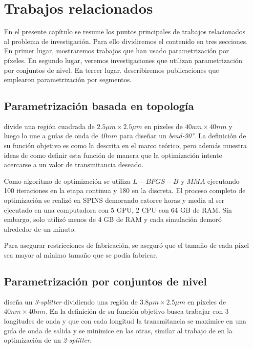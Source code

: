 \chapter{Trabajos relacionados}

En el presente capítulo se resume los puntos principales de trabajos relacionados al problema de investigación.
Para ello dividiremos el contenido en tres secciones. 
En primer lugar, mostraremos trabajos que han usado parametrización por píxeles.
En segundo lugar, veremos investigaciones que utilizan parametrización por conjuntos de nivel.
En tercer lugar, describiremos publicaciones que emplearon parametrización por segmentos.

\section{Parametrización basada en topología}

\cite{Su2020} divide una región cuadrada de $2.5 \mu m \times 2.5 \mu m$ en píxeles de $40 nm \times 40 nm$ y luego lo une a guías de onda de $40 nm$ para diseñar un \emph{bend-90°}. 
La definición de su función objetivo es como la descrita en el marco teórico, pero además muestra ideas de como definir esta función de manera que la optimización intente acercarse a un valor de transmitancia deseado.

Como algoritmo de optimización se utiliza $L-BFGS-B$ y $MMA$ ejecutando 100 iteraciones en la etapa continua y 180 en la discreta.
El proceso completo de optimización se realizó en SPINS demorando catorce horas y media al ser ejecutado en una computadora con 5 GPU, 2 CPU con 64 GB de RAM.
Sin embargo, solo utilizó menos de 4 GB de RAM y cada simulación demoró alrededor de un minuto.

Para asegurar restricciones de fabricación, \cite{Su2020} se aseguró que el tamaño de cada píxel sea mayor al mínimo tamaño que se podía fabricar.

\section{Parametrización por conjuntos de nivel}

\cite{Piggott2017} diseña un \emph{3-splitter} dividiendo una región de $3.8 \mu m \times 2.5 \mu m$ en píxeles de $40 nm \times 40 nm$.
En la definición de su función objetivo busca trabajar con 3 longitudes de onda y que con cada longitud la transmitancia se maximice en una guía de onda de salida y se minimice en las otras, similar al trabajo de \cite{Su2020} en la optimización de un \emph{2-splitter}.

